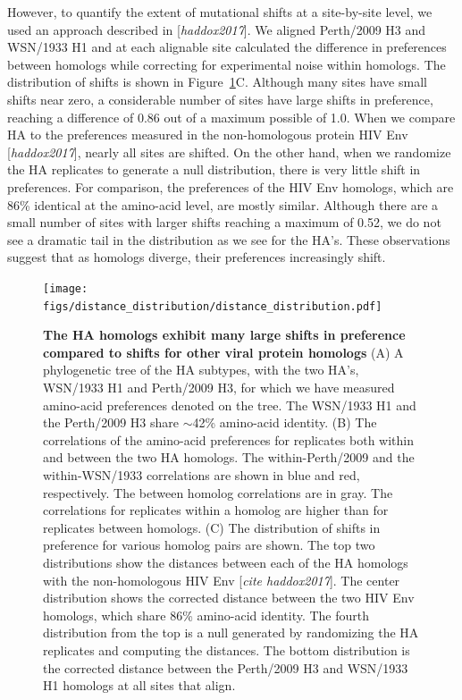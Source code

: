\documentclass[11pt]{article}
\newcommand{\comment}[1]{{\color{red}[\textsl{#1}]}}
\begin{document}
However, to quantify the extent of mutational shifts at a site-by-site level, we used an approach described in \comment{haddox2017}.
We aligned Perth/2009 H3 and WSN/1933 H1 and at each alignable site calculated the difference in preferences between homologs while correcting for experimental noise within homologs.
The distribution of shifts is shown in Figure~\ref{fig:distance_distribution}C.
Although many sites have small shifts near zero, a considerable number of sites have large shifts in preference, reaching a difference of 0.86 out of a maximum possible of 1.0.
When we compare HA to the preferences measured in the non-homologous protein HIV Env \comment{haddox2017}, nearly all sites are shifted.
On the other hand, when we randomize the HA replicates to generate a null distribution, there is very little shift in preferences. 
For comparison, the preferences of the HIV Env homologs, which are 86\% identical at the amino-acid level, are mostly similar. 
Although there are a small number of sites with larger shifts reaching a maximum of 0.52, we do not see a dramatic tail in the distribution as we see for the HA's.
These observations suggest that as homologs diverge, their preferences increasingly shift.

\begin{figure}
\centerline{\texttt{[image: figs/distance\_distribution/distance\_distribution.pdf]}}
\caption{\label{fig:distance_distribution}
{\bf The HA homologs exhibit many large shifts in preference compared to shifts for other viral protein homologs}
(A) A phylogenetic tree of the HA subtypes, with the two HA's, WSN/1933 H1 and Perth/2009 H3, for which we have measured amino-acid preferences denoted on the tree. 
The WSN/1933 H1 and the Perth/2009 H3 share $\sim$42\% amino-acid identity.
(B) The correlations of the amino-acid preferences for replicates both within and between the two HA homologs. 
The within-Perth/2009 and the within-WSN/1933 correlations are shown in blue and red, respectively.
The between homolog correlations are in gray.
The correlations for replicates within a homolog are higher than for replicates between homologs.
(C) The distribution of shifts in preference for various homolog pairs are shown.
The top two distributions show the distances between each of the HA homologs with the non-homologous HIV Env \comment{cite haddox2017}. 
The center distribution shows the corrected distance between the two HIV Env homologs, which share 86\% amino-acid identity.
The fourth distribution from the top is a null generated by randomizing the HA replicates and computing the distances.
The bottom distribution is the corrected distance between the Perth/2009 H3 and WSN/1933 H1 homologs at all sites that align.
}
\end{figure}
\end{document}
